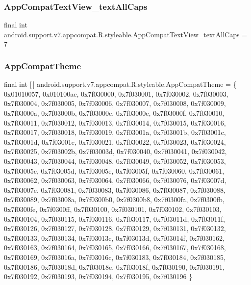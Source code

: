 \subsubsection{\texorpdfstring{App\+Compat\+Text\+View\+\_\+text\+All\+Caps}{AppCompatTextView\_textAllCaps}}
{\footnotesize\ttfamily final int android.\+support.\+v7.\+appcompat.\+R.\+styleable.\+App\+Compat\+Text\+View\+\_\+text\+All\+Caps = 7\hspace{0.3cm}{\ttfamily [static]}}

\mbox{\label{classandroid_1_1support_1_1v7_1_1appcompat_1_1R_1_1styleable_a5c42f89e8a410c323be34208d75c430b}} 
\subsubsection{\texorpdfstring{App\+Compat\+Theme}{AppCompatTheme}}
{\footnotesize\ttfamily final int \mbox{[}$\,$\mbox{]} android.\+support.\+v7.\+appcompat.\+R.\+styleable.\+App\+Compat\+Theme = \{ 0x01010057, 0x010100ae, 0x7f030000, 0x7f030001, 0x7f030002, 0x7f030003, 0x7f030004, 0x7f030005, 0x7f030006, 0x7f030007, 0x7f030008, 0x7f030009, 0x7f03000a, 0x7f03000b, 0x7f03000c, 0x7f03000e, 0x7f03000f, 0x7f030010, 0x7f030011, 0x7f030012, 0x7f030013, 0x7f030014, 0x7f030015, 0x7f030016, 0x7f030017, 0x7f030018, 0x7f030019, 0x7f03001a, 0x7f03001b, 0x7f03001c, 0x7f03001d, 0x7f03001e, 0x7f030021, 0x7f030022, 0x7f030023, 0x7f030024, 0x7f030025, 0x7f03002b, 0x7f03003d, 0x7f030040, 0x7f030041, 0x7f030042, 0x7f030043, 0x7f030044, 0x7f030048, 0x7f030049, 0x7f030052, 0x7f030053, 0x7f03005c, 0x7f03005d, 0x7f03005e, 0x7f03005f, 0x7f030060, 0x7f030061, 0x7f030062, 0x7f030063, 0x7f030064, 0x7f030066, 0x7f030076, 0x7f03007d, 0x7f03007e, 0x7f030081, 0x7f030083, 0x7f030086, 0x7f030087, 0x7f030088, 0x7f030089, 0x7f03008a, 0x7f0300b0, 0x7f0300b8, 0x7f0300fa, 0x7f0300fb, 0x7f0300fe, 0x7f0300ff, 0x7f030100, 0x7f030101, 0x7f030102, 0x7f030103, 0x7f030104, 0x7f030115, 0x7f030116, 0x7f030117, 0x7f03011d, 0x7f03011f, 0x7f030126, 0x7f030127, 0x7f030128, 0x7f030129, 0x7f030131, 0x7f030132, 0x7f030133, 0x7f030134, 0x7f03013c, 0x7f03013d, 0x7f03014f, 0x7f030162, 0x7f030163, 0x7f030164, 0x7f030165, 0x7f030166, 0x7f030167, 0x7f030168, 0x7f030169, 0x7f03016a, 0x7f03016c, 0x7f030183, 0x7f030184, 0x7f030185, 0x7f030186, 0x7f03018d, 0x7f03018e, 0x7f03018f, 0x7f030190, 0x7f030191, 0x7f030192, 0x7f030193, 0x7f030194, 0x7f030195, 0x7f030196 \}\hspace{0.3cm}{\ttfamily [static]}}

